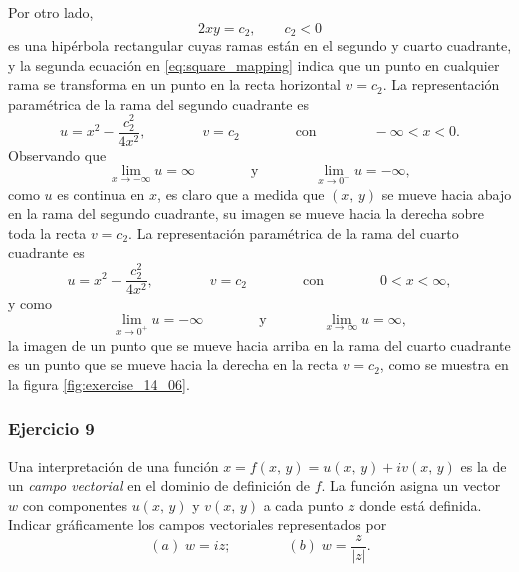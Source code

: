 \documentclass[a4paper]{report}
\begin{document}
Por otro lado, 
\[
 2xy=c_2,\qquad c_2<0
\]
es una hipérbola rectangular cuyas ramas están en el segundo y cuarto cuadrante, y la segunda ecuación en \ref{eq:square_mapping} indica que un punto en cualquier rama se transforma en un punto en la recta horizontal \(v=c_2\). La representación paramétrica de la rama del segundo cuadrante es
\[
 u=x^2-\frac{c_2^2}{4x^2},\qquad\qquad v=c_2\qquad\qquad\textrm{con}\qquad\qquad-\infty<x<0.
\]
Observando que 
\[
 \lim_{x\to-\infty}u=\infty
 \qquad\qquad\textrm{y}\qquad\qquad
 \lim_{x\to0^-}u=-\infty,
\]
como \(u\) es continua en \(x\), es claro que a medida que \((x,\,y)\) se mueve hacia abajo en la rama del segundo cuadrante, su imagen se mueve hacia la derecha sobre toda la recta \(v=c_2\). La representación paramétrica de la rama del cuarto cuadrante es
\[
 u=x^2-\frac{c_2^2}{4x^2},\qquad\qquad v=c_2\qquad\qquad\textrm{con}\qquad\qquad0<x<\infty,
\]
y como
\[
 \lim_{x\to0^+}u=-\infty
 \qquad\qquad\textrm{y}\qquad\qquad
 \lim_{x\to\infty}u=\infty,
\]
la imagen de un punto que se mueve hacia arriba en la rama del cuarto cuadrante es un punto que se mueve hacia la derecha en la recta \(v=c_2\), como se muestra en la figura \ref{fig:exercise_14_06}.

\subsubsection{Ejercicio 9}

Una interpretación de una función \(x=f(x,\,y)=u(x,\,y)+iv(x,\,y)\) es la de un \emph{campo vectorial} en el dominio de definición de \(f\). La función asigna un vector \(w\) con componentes \(u(x,\,y)\) y \(v(x,\,y)\) a cada punto \(z\) donde está definida. Indicar gráficamente los campos vectoriales representados por
\[
 (\textit{a})\;w=iz;\qquad\qquad (\textit{b})\;w=\frac{z}{|z|}.
\]
\end{document}
